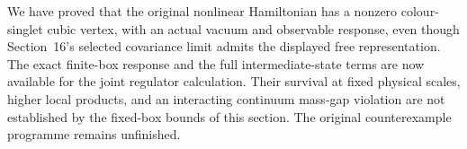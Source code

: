 We have proved that the original nonlinear Hamiltonian has a nonzero
colour-singlet cubic vertex, with an actual vacuum and observable
response, even though Section~16's selected covariance limit admits the
displayed free representation. The exact finite-box response and the
full intermediate-state terms are now available for the joint regulator
calculation. Their survival at fixed physical scales, higher local
products, and an interacting continuum mass-gap violation are not
established by the fixed-box bounds of this section. The original
counterexample programme remains unfinished.
